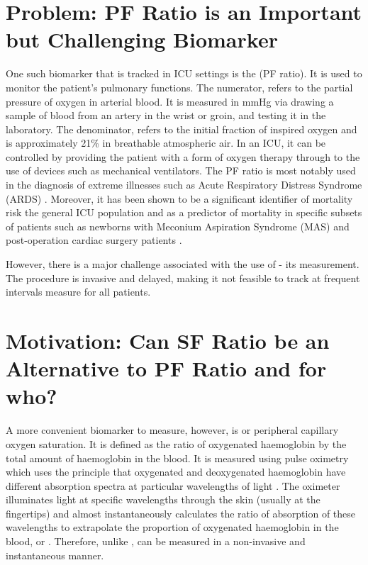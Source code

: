 \section{Problem: PF Ratio is an Important but Challenging Biomarker}

One such biomarker that is tracked in ICU settings is the  \PF(PF ratio). It is used to monitor the patient's pulmonary functions. The numerator, \Pa refers to the partial pressure of oxygen in arterial blood. It is measured in mmHg via drawing a sample of blood from an artery in the wrist or groin, and testing it in the laboratory. The denominator, \Fi refers to the initial fraction of inspired oxygen and is approximately 21\% in breathable atmospheric air. In an ICU, it can be controlled by providing the patient with a form of oxygen therapy through to the use of devices such as mechanical ventilators. The PF ratio is most notably used in the diagnosis of extreme illnesses such as Acute Respiratory Distress Syndrome (ARDS) \citep{bernard1994american}. Moreover, it has been shown to be a significant identifier of mortality risk the general ICU population \citep{villar2011risk} and as a predictor of mortality in specific subsets of patients such as newborns with Meconium Aspiration Syndrome (MAS)  \citep{narayanan2019pao2} and post-operation cardiac surgery patients \citep{esteve2014evaluation}.

However, there is a major challenge associated with the use of \Pa - its measurement. The  procedure is invasive and delayed, making it not feasible to track \Pa at frequent intervals measure for all patients. 


\section{Motivation: Can SF Ratio be an Alternative to PF Ratio and for who?}
A more convenient biomarker to measure, however, is \Sp  or peripheral capillary oxygen saturation. It is defined as the ratio of oxygenated haemoglobin by the total amount of haemoglobin in the blood. It is measured using pulse oximetry which uses the principle that oxygenated and deoxygenated haemoglobin have different absorption spectra at particular wavelengths of light \citep{jubran1999pulse} . The oximeter illuminates light at specific wavelengths through the skin (usually at the fingertips) and almost instantaneously calculates the ratio of absorption of these wavelengths to extrapolate the proportion of oxygenated haemoglobin in the blood, or \Sp \citep{jubran2015}. Therefore, unlike \Pa, \Sp can be measured in a non-invasive and instantaneous manner. 

